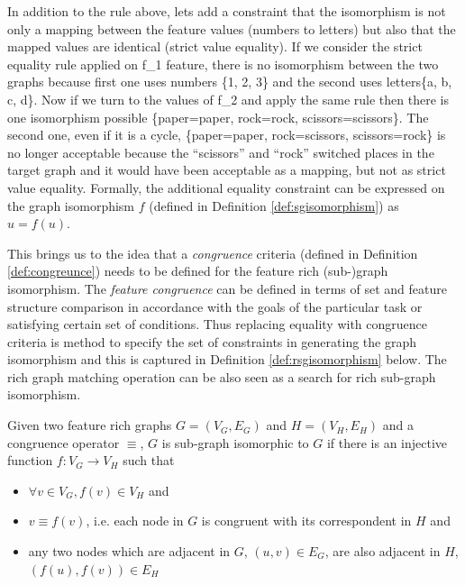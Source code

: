In addition to the rule above, lets add a constraint that the isomorphism is not only a mapping between the feature values (numbers to letters) but also that the mapped values are identical (strict value equality). 
If we consider the strict equality rule applied on f_1 feature, there is no isomorphism between the two graphs because first one uses numbers  \{1, 2, 3\} and the second uses letters\{a, b, c, d\}. Now if we turn to the values of f_2 and apply the same rule then there is one isomorphism possible \{paper=paper, rock=rock, scissors=scissors\}. The second one, even if it is a cycle, \{paper=paper, rock=scissors, scissors=rock\} is no longer acceptable because the ``scissors'' and ``rock'' switched places in the target graph and it would have been acceptable as a mapping, but not as strict value equality. Formally, the additional equality constraint can be expressed on the graph isomorphism $f$ (defined in Definition \ref{def:sgisomorphism}) as $u=f(u)$.

This brings us to the idea that a \textit{congruence} criteria (defined in Definition \ref{def:congreunce}) needs to be defined for the feature rich (sub-)graph isomorphism. The \textit{feature congruence} can be defined in terms of set and feature structure comparison in accordance with the goals of the particular task or satisfying certain set of conditions. Thus replacing equality with congruence criteria is method to specify the set of constraints in generating the graph isomorphism and this is captured in Definition \ref{def:rsgisomorphism} below. The rich graph matching operation can be also seen as a search for rich sub-graph isomorphism. 

\begin{definition}\label{def:rsgisomorphism}
    Given two feature rich graphs $G=(V_G,E_G)$ and $H=(V_H,E_H)$ and a congruence operator $\equiv$, $G$ is sub-graph isomorphic to $G$ if there is an injective function $f:V_G \rightarrow V_H$ such that
    \begin{itemize}
        \item $\forall v \in V_G, f(v) \in V_H$ and
        \item $v \equiv f(v)$, i.e. each node in $G$ is congruent with its correspondent in $H$ and
        \item any two nodes which are adjacent in $G$, $(u,v) \in E_G$, are also adjacent in $H$, $(f(u), f(v)) \in E_H $
    \end{itemize}
\end{definition}


